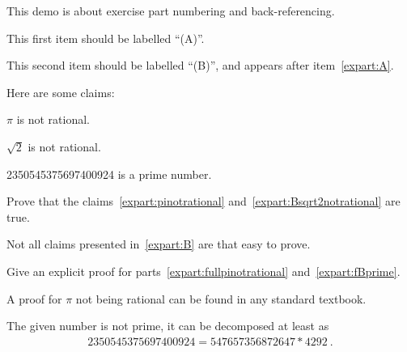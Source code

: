 \documentclass[11pt,a4paper]{article}
\begin{document}
\MakeUebungHeader


This demo is about exercise part numbering and back-referencing.

\begin{exenumerate}
\item \label{expart:A}
  This first item should be labelled ``(A)''.

\item \label{expart:B}
  This second item should be labelled ``(B)'', and appears after item~\ref{expart:A}.

  Here are some claims:
  \begin{exenumerate}
  \item \label{expart:pinotrational} 
    $\pi$ is not rational.
  \item \label{expart:Bsqrt2notrational}
    $\sqrt{2}$ is not rational.
  \item {}
    2350545375697400924 is a prime number.
  \end{exenumerate}

  Prove that the claims~\ref{expart:pinotrational} and~\ref{expart:Bsqrt2notrational} are
  true.

\end{exenumerate}  


Not all claims presented in~\ref{expart:B} are that easy to prove. 

\begin{exenumerate} %
\item Give an explicit proof for parts~\ref{expart:fullpinotrational}
  and~\ref{expart:fBprime}.

  \begin{solution}
    A proof for $\pi$ not being rational can be found in any standard textbook.

    The given number is not prime, it can be decomposed at least as
    \begin{align}
      2350545375697400924 = 547657356872647 * 4292\ .
    \end{align}
  \end{solution}
\end{exenumerate}
\end{document}

